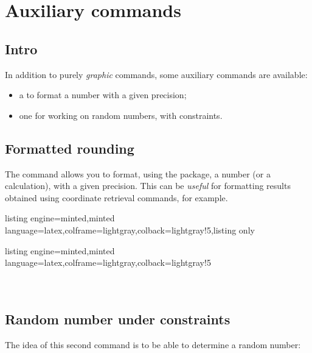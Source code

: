 \documentclass[11pt,a4paper]{ltxdoc}
\begin{document}
\newpage

\section{Auxiliary commands}

\subsection{Intro}

In addition to purely \textit{graphic} commands, some auxiliary commands are available:

\begin{itemize}
	\item a to format a number with a given precision;
	\item one for working on random numbers, with constraints.
\end{itemize}

\subsection{Formatted rounding}\label{round number}

The  command allows you to format, using the  package, a number (or a calculation), with a given precision. This can be \textit{useful} for formatting results obtained using coordinate retrieval commands, for example.

\begin{tcblisting}{listing engine=minted,minted language=latex,colframe=lightgray,colback=lightgray!5,listing only}
\end{tcblisting}

\begin{tcblisting}{listing engine=minted,minted language=latex,colframe=lightgray,colback=lightgray!5}
\\
\\
\\
\end{tcblisting}

\subsection{Random number under constraints}\label{nbalea}

The idea of this second command is to be able to determine a random number:
\end{document}
